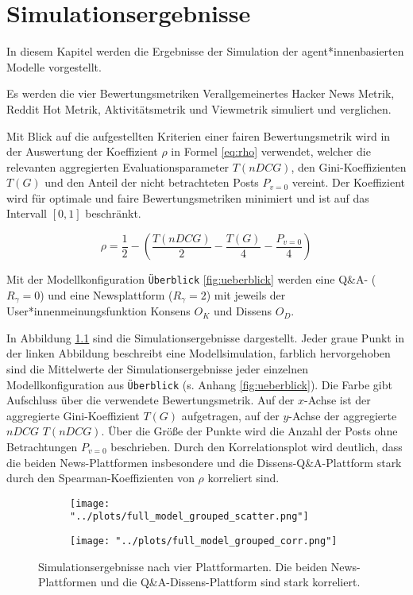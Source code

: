 \chapter{Simulationsergebnisse}

In diesem Kapitel werden die Ergebnisse der Simulation der agent*innenbasierten Modelle vorgestellt.

Es werden die vier Bewertungsmetriken Verallgemeinertes Hacker News Metrik, Reddit Hot Metrik, Aktivitätsmetrik und Viewmetrik simuliert und verglichen.

Mit Blick auf die aufgestellten Kriterien einer fairen Bewertungsmetrik wird in der Auswertung der Koeffizient $\rho$ in Formel \ref{eq:rho} verwendet, welcher die relevanten aggregierten Evaluationsparameter $T(nDCG)$, den Gini-Koeffizienten $T(G)$ und den Anteil der nicht betrachteten Posts $P_{v=0}$ vereint. Der Koeffizient wird für optimale und faire Bewertungsmetriken minimiert und ist auf das Intervall $[0,1]$ beschränkt.

\begin{equation}
\label{eq:rho}
\rho =  \frac{1}{2} - (\frac{T(nDCG)}{2} - \frac{T(G)}{4} - \frac{P_{v=0}}{4})
\end{equation}

Mit der Modellkonfiguration \texttt{Überblick} \ref{fig:ueberblick} werden eine Q\&A- ($R_\gamma = 0$) und eine Newsplattform ($R_\gamma = 2$) mit jeweils der User*innenmeinungsfunktion Konsens $O_K$ und Dissens $O_D$.

In Abbildung \ref{fig:cases} sind die Simulationsergebnisse dargestellt. Jeder graue Punkt in der linken Abbildung beschreibt eine Modellsimulation, farblich hervorgehoben sind die Mittelwerte der Simulationsergebnisse jeder einzelnen Modellkonfiguration aus \texttt{Überblick} (s. Anhang \ref{fig:ueberblick}). Die Farbe gibt Aufschluss über die verwendete Bewertungsmetrik. Auf der $x$-Achse ist der aggregierte Gini-Koeffizient $T(G)$ aufgetragen, auf der $y$-Achse der aggregierte $nDCG$ $T(nDCG)$. Über die Größe der Punkte wird die Anzahl der Posts ohne Betrachtungen $P_{v=0}$ beschrieben. Durch den Korrelationsplot wird deutlich, dass die beiden News-Plattformen insbesondere und die Dissens-Q\&A-Plattform stark durch den Spearman-Koeffizienten von $\rho$ korreliert sind.

\begin{figure}[!h]
	\begin{subfigure}{0.5\textwidth}
		\texttt{[image: "../plots/full\_model\_grouped\_scatter.png"]}
	\end{subfigure}
	\begin{subfigure}{0.5\textwidth}
		\texttt{[image: "../plots/full\_model\_grouped\_corr.png"]}
	\end{subfigure}
	\caption{Simulationsergebnisse nach vier Plattformarten. Die beiden News-Plattformen und die Q\&A-Dissens-Plattform sind stark korreliert.}
	\label{fig:cases}	
\end{figure}

